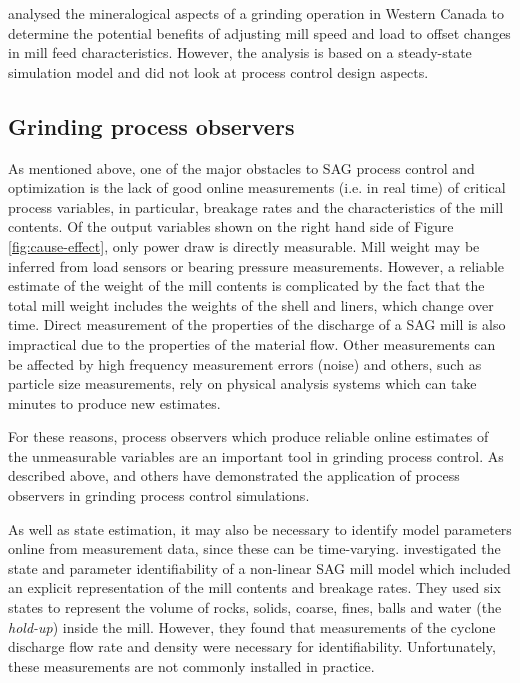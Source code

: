 \cite{liu_development_2018} analysed the mineralogical aspects of a grinding operation in Western Canada to determine the potential benefits of adjusting mill speed and load to offset changes in mill feed characteristics. However, the analysis is based on a steady-state simulation model and did not look at process control design aspects.


\subsection*{Grinding process observers}

As mentioned above, one of the major obstacles to SAG process control and optimization is the lack of good online measurements (i.e. in real time) of critical process variables, in particular, breakage rates and the characteristics of the mill contents. Of the output variables shown on the right hand side of Figure \ref{fig:cause-effect}, only power draw is directly measurable. Mill weight may be inferred from load sensors or bearing pressure measurements. However, a reliable estimate of the weight of the mill contents is complicated by the fact that the total mill weight includes the weights of the shell and liners, which change over time. Direct measurement of the properties of the discharge of a SAG mill is also impractical due to the properties of the material flow.  Other measurements can be affected by high frequency measurement errors (noise) and others, such as particle size measurements, rely on physical analysis systems which can take minutes to produce new estimates.

For these reasons, process observers which produce reliable online estimates of the unmeasurable variables are an important tool in grinding process control.  As described above, \cite{le_roux_throughput_2016} and others have demonstrated the application of process observers in grinding process control simulations.  

As well as state estimation, it may also be necessary to identify model parameters online from measurement data, since these can be time-varying. \cite{le_roux_state_2016} investigated the state and parameter identifiability of a non-linear SAG mill model which included an explicit representation of the mill contents and breakage rates. They used six states to represent the volume of rocks, solids, coarse, fines, balls and water (the \textit{hold-up}) inside the mill. However, they found that measurements of the cyclone discharge flow rate and density were necessary for identifiability. Unfortunately, these measurements are not commonly installed in practice.

